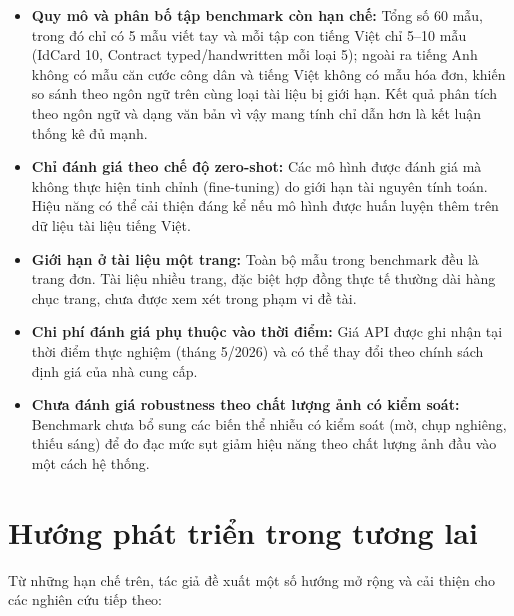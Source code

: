 ﻿\documentclass[12pt]{report}
\begin{document}
\begin{itemize}
    \item \textbf{Quy mô và phân bố tập benchmark còn hạn chế:} Tổng số 60 mẫu, trong đó chỉ có 5 mẫu viết tay và mỗi tập con tiếng Việt chỉ 5--10 mẫu (IdCard 10, Contract typed/handwritten mỗi loại 5); ngoài ra tiếng Anh không có mẫu căn cước công dân và tiếng Việt không có mẫu hóa đơn, khiến so sánh theo ngôn ngữ trên cùng loại tài liệu bị giới hạn. Kết quả phân tích theo ngôn ngữ và dạng văn bản vì vậy mang tính chỉ dẫn hơn là kết luận thống kê đủ mạnh.

    \item \textbf{Chỉ đánh giá theo chế độ zero-shot:} Các mô hình được đánh giá mà không thực hiện tinh chỉnh (fine-tuning) do giới hạn tài nguyên tính toán. Hiệu năng có thể cải thiện đáng kể nếu mô hình được huấn luyện thêm trên dữ liệu tài liệu tiếng Việt.

    \item \textbf{Giới hạn ở tài liệu một trang:} Toàn bộ mẫu trong benchmark đều là trang đơn. Tài liệu nhiều trang, đặc biệt hợp đồng thực tế thường dài hàng chục trang, chưa được xem xét trong phạm vi đề tài.

    \item \textbf{Chi phí đánh giá phụ thuộc vào thời điểm:} Giá API được ghi nhận tại thời điểm thực nghiệm (tháng 5/2026) và có thể thay đổi theo chính sách định giá của nhà cung cấp.

    \item \textbf{Chưa đánh giá robustness theo chất lượng ảnh có kiểm soát:} Benchmark chưa bổ sung các biến thể nhiễu có kiểm soát (mờ, chụp nghiêng, thiếu sáng) để đo đạc mức sụt giảm hiệu năng theo chất lượng ảnh đầu vào một cách hệ thống.
\end{itemize}

\section{Hướng phát triển trong tương lai}\label{sec:future_work}

Từ những hạn chế trên, tác giả đề xuất một số hướng mở rộng và cải thiện cho các nghiên cứu tiếp theo:
\end{document}
